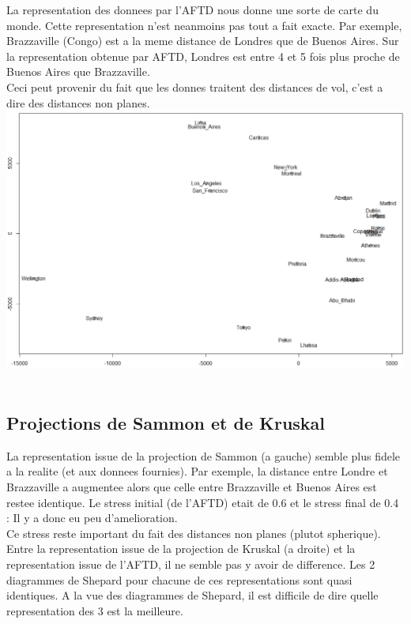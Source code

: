 \documentclass[a4paper,11pt]{article}
\begin{document}
\noindent La representation des donnees par l'AFTD nous donne une sorte de carte du monde. Cette representation n'est neanmoins pas tout a fait exacte. Par exemple, Brazzaville (Congo) est a la meme distance de Londres que de Buenos Aires. Sur la representation obtenue par AFTD, Londres est entre 4 et 5 fois plus proche de Buenos Aires que Brazzaville. \\

\noindent Ceci peut provenir du fait que les donnes traitent des distances de vol, c'est a dire des distances non planes.\\

\includegraphics[width=.9\textwidth]{Exo3/aftd.pdf}\\
\\

\subsection{Projections de Sammon et de Kruskal}

\noindent La representation issue de la projection de Sammon (a gauche) semble plus fidele a la realite (et aux donnees fournies). Par exemple, la distance entre Londre et Brazzaville a augmentee alors que celle entre Brazzaville et Buenos Aires est restee identique. Le stress initial (de l'AFTD) etait de 0.6 et le stress final de 0.4 : Il y a donc eu peu d'amelioration. \\
Ce stress reste important du fait des distances non planes (plutot spherique).\\

\noindent Entre la representation issue de la projection de Kruskal (a droite) et la representation issue de l'AFTD, il ne semble pas y avoir de difference. Les 2 diagrammes de Shepard pour chacune de ces representations sont quasi identiques.
A la vue des diagrammes de Shepard, il est difficile de dire quelle representation des 3 est la meilleure.\\
\end{document}
